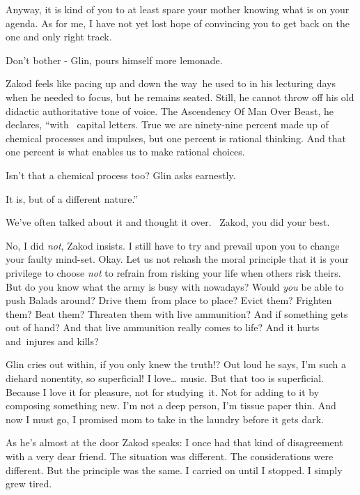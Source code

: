 \documentclass[letterpaper]{article}
\begin{document}
{\textquotedbl}Anyway, it is kind of you to at least spare your mother knowing what is on your agenda. As for me, I have
not yet lost hope of convincing you to get back on the one and only right track.{\textquotedbl} 

{\textquotedbl}Don't bother -{\textquotedbl} Glin, pours himself more lemonade. 

Zakod feels like pacing up and down the way~he used to in his lecturing days when he needed to focus, but he remains
seated. Still, he cannot throw off his old didactic authoritative tone of voice. {\textquotedbl}The Ascendency Of Man
Over Beast,{\textquotedbl} he declares, ``with \ capital letters. True we are ninety-nine percent made up of chemical
processes and impulses, but one percent is rational thinking. And that one percent is what enables us to make rational
choices.{\textquotedbl} 

{\textquotedbl}Isn't that a chemical process too?{\textquotedbl} Glin asks{
}earnestly. 

{\textquotedbl}It is, but of a different nature.'' 

{\textquotedbl}We've often talked about it and thought it over. \ Zakod, you did your best.{\textquotedbl} 

{\textquotedbl}No, I did \textit{not},{\textquotedbl} Zakod insists. {\textquotedbl}I still have to try and prevail upon
you to change your faulty mind-set. Okay. Let us not rehash the moral principle that it is your privilege to choose
\textit{not} to refrain from risking your life when others risk theirs. But do you know what the army is busy with
nowadays? Would \textit{you} be able to push Balads around? Drive them~from place to place? Evict them? Frighten them?
Beat them? Threaten them with live ammunition? And if something gets out of hand? And that live ammunition really comes
to life? And it hurts and~injures and kills?{\textquotedbl} 

Glin cries out within, if you only knew the truth!? Out loud he says, {\textquotedbl}I'm such a diehard nonentity, so
superficial! I love{\dots} music. But that too is superficial. Because I love it for pleasure, not for studying~it. Not
for adding to it by composing something new. I'm not a deep person, I'm tissue paper thin. And now I must go, I
promised mom to take in the laundry before it gets dark.{\textquotedbl} 

As he's almost at the door Zakod speaks: {\textquotedbl}I once had that kind of disagreement with a very dear friend.
The situation was different. The considerations were different. But the principle was the same. I carried on until I
stopped. I simply{ }grew tired.{\textquotedbl} 
\end{document}
